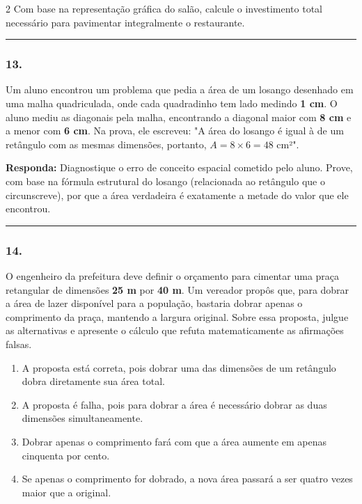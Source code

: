 \documentclass[twoside, 10pt, a4paper]{article}
\newlength{\espacoPreQuestao}\setlength{\espacoPreQuestao}{0.1cm}
\newlength{\espacoQuestao}\setlength{\espacoQuestao}{0.2cm}
\newlength{\espacoAlt}\setlength{\espacoAlt}{0.2cm}
\begin{document}
\begin{multicols*}{2}
Com base na representação gráfica do salão, calcule o investimento total necessário para pavimentar integralmente o restaurante.
\par\vspace{\espacoQuestao}

\noindent\textcolor{CorLinha}{\rule{\linewidth}{0.5pt}}
\par\vspace{\espacoPreQuestao}
\subsubsection*{13.} Um aluno encontrou um problema que pedia a área de um losango desenhado em uma malha quadriculada, onde cada quadradinho tem lado medindo \textbf{1 cm}. O aluno mediu as diagonais pela malha, encontrando a diagonal maior com \textbf{8 cm} e a menor com \textbf{6 cm}. Na prova, ele escreveu: "A área do losango é igual à de um retângulo com as mesmas dimensões, portanto, $ A = 8 \times 6 = 48 $ cm²".
\begin{boxresponda}
\textbf{Responda:} Diagnostique o erro de conceito espacial cometido pelo aluno. Prove, com base na fórmula estrutural do losango (relacionada ao retângulo que o circunscreve), por que a área verdadeira é exatamente a metade do valor que ele encontrou.
\end{boxresponda}
\par\vspace{\espacoQuestao}

\noindent\textcolor{CorLinha}{\rule{\linewidth}{0.5pt}} 
\par\vspace{\espacoPreQuestao}
\subsubsection*{14.} O engenheiro da prefeitura deve definir o orçamento para cimentar uma praça retangular de dimensões \textbf{25 m} por \textbf{40 m}. Um vereador propôs que, para dobrar a área de lazer disponível para a população, bastaria dobrar apenas o comprimento da praça, mantendo a largura original. Sobre essa proposta, julgue as alternativas e apresente o cálculo que refuta matematicamente as afirmações falsas.

\begin{enumerate}[label=\alph*), itemsep=\espacoAlt]
\item A proposta está correta, pois dobrar uma das dimensões de um retângulo dobra diretamente sua área total.
\item A proposta é falha, pois para dobrar a área é necessário dobrar as duas dimensões simultaneamente.
\item Dobrar apenas o comprimento fará com que a área aumente em apenas cinquenta por cento.
\item Se apenas o comprimento for dobrado, a nova área passará a ser quatro vezes maior que a original.
\end{enumerate}
\par\vspace{\espacoQuestao}


\end{multicols*}
\end{document}
